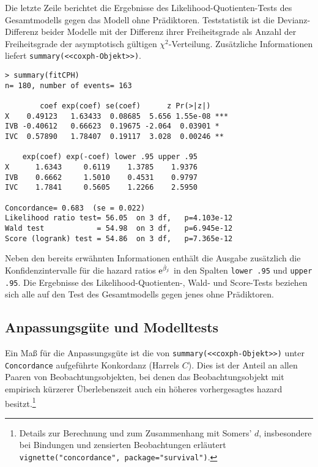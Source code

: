 Die letzte Zeile berichtet die Ergebnisse des Likelihood-Quotienten-Tests des Gesamtmodells gegen das Modell ohne Prädiktoren. Teststatistik ist die Devianz-Differenz beider Modelle mit der Differenz ihrer Freiheitsgrade als Anzahl der Freiheitsgrade der asymptotisch gültigen $\chi^{2}$-Verteilung. Zusätzliche Informationen liefert \lstinline!summary(<<coxph-Objekt>>)!.
\begin{lstlisting}
> summary(fitCPH)
n= 180, number of events= 163

        coef exp(coef) se(coef)      z Pr(>|z|)
X    0.49123   1.63433  0.08685  5.656 1.55e-08 ***
IVB -0.40612   0.66623  0.19675 -2.064  0.03901 *
IVC  0.57890   1.78407  0.19117  3.028  0.00246 **

    exp(coef) exp(-coef) lower .95 upper .95
X      1.6343     0.6119    1.3785    1.9376
IVB    0.6662     1.5010    0.4531    0.9797
IVC    1.7841     0.5605    1.2266    2.5950

Concordance= 0.683  (se = 0.022)
Likelihood ratio test= 56.05  on 3 df,   p=4.103e-12
Wald test            = 54.98  on 3 df,   p=6.945e-12
Score (logrank) test = 54.86  on 3 df,   p=7.365e-12
\end{lstlisting}

Neben den bereits erwähnten Informationen enthält die Ausgabe zusätzlich die Konfidenzintervalle für die hazard ratios ${\mathrm{e}}^{\hat{\beta}_{j}}$ in den Spalten \lstinline!lower .95! und \lstinline!upper .95!. Die Ergebnisse des Likelihood-Quotienten-, Wald- und Score-Tests beziehen sich alle auf den Test des Gesamtmodells gegen jenes ohne Prädiktoren.

\subsection{Anpassungsgüte und Modelltests}

Ein Maß für die Anpassungsgüte ist die von \lstinline!summary(<<coxph-Objekt>>)! unter \lstinline!Concordance! aufgeführte Konkordanz (Harrels $C$). Dies ist der Anteil an allen Paaren von Beobachtungsobjekten, bei denen das Beobachtungsobjekt mit empirisch kürzerer Überlebenszeit auch ein höheres vorhergesagtes hazard besitzt.\footnote{Details zur Berechnung und zum Zusammenhang mit Somers' $d$, insbesondere bei Bindungen und zensierten Beobachtungen erläutert \lstinline!vignette("concordance", package="survival")!.}

